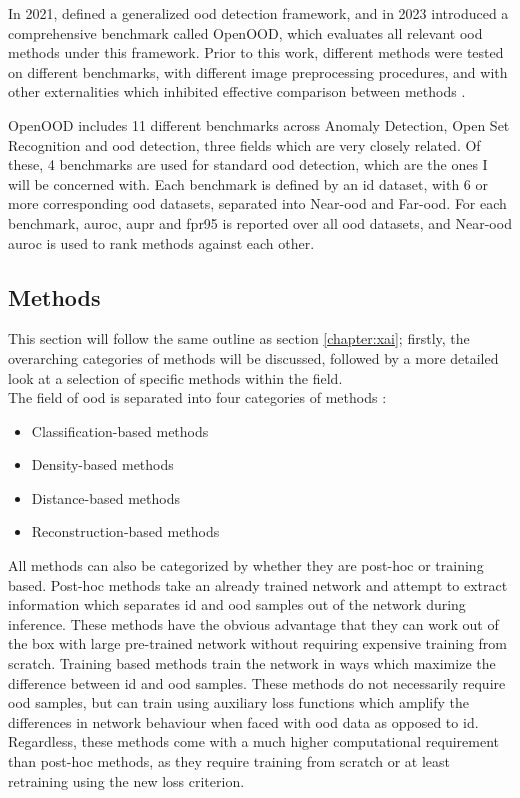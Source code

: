 \documentclass[UKenglish]{uiomasterthesis} %
\theoremstyle{definition}
\begin{document}
In 2021, \cite{oodoverview} defined a generalized \ac{ood} detection framework, and in 2023 \cite{openood} introduced a comprehensive benchmark called OpenOOD, which evaluates all relevant \ac{ood} methods under this framework. Prior to this work, different methods were tested on different benchmarks, with different image preprocessing procedures, and with other externalities which inhibited effective comparison between methods \cite{openood}.

OpenOOD includes 11 different benchmarks across Anomaly Detection, Open Set Recognition and \ac{ood} detection, three fields which are very closely related. Of these, 4 benchmarks are used for standard \ac{ood} detection, which are the ones I will be concerned with. Each benchmark is defined by an \ac{id} dataset, with 6 or more corresponding \ac{ood} datasets, separated into Near-\ac{ood} and Far-\ac{ood}. For each benchmark, \ac{auroc}, \ac{aupr} and \ac{fpr95} is reported over all \ac{ood} datasets, and Near-\ac{ood} \ac{auroc} is used to rank methods against each other.

\subsection{Methods}

This section will follow the same outline as section \ref{chapter:xai}; firstly, the overarching categories of methods will be discussed, followed by a more detailed look at a selection of specific methods within the field.
\\

The field of \ac{ood} is separated into four categories of methods \cite{oodoverview}:

\begin{itemize}
  \item Classification-based methods
  \item Density-based methods
  \item Distance-based methods
  \item Reconstruction-based methods
\end{itemize}

All methods can also be categorized by whether they are post-hoc or training based. Post-hoc methods take an already trained network and attempt to extract information which separates \ac{id} and \ac{ood} samples out of the network during inference. These methods have the obvious advantage that they can work out of the box with large pre-trained network without requiring expensive training from scratch. Training based methods train the network in ways which maximize the difference between \ac{id} and \ac{ood} samples. These methods do not necessarily require \ac{ood} samples, but can train using auxiliary loss functions which amplify the differences in network behaviour when faced with \ac{ood} data as opposed to \ac{id}. Regardless, these methods come with a much higher computational requirement than post-hoc methods, as they require training from scratch or at least retraining using the new loss criterion. 
\end{document}
